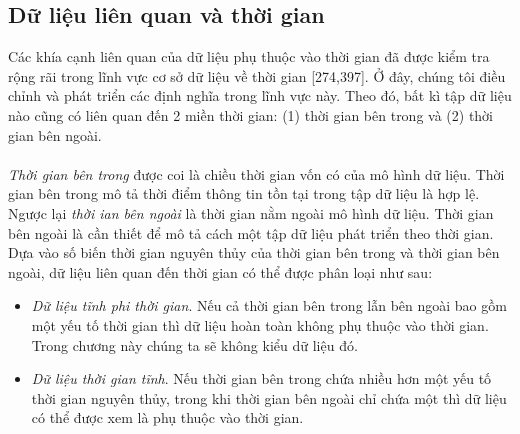 \subsection{Dữ liệu liên quan và thời gian}
Các khía cạnh liên quan của dữ liệu phụ thuộc vào thời gian đã được kiểm tra rộng rãi trong lĩnh vực cơ sở dữ liệu về thời gian [274,397]. Ở đây, chúng tôi điều chỉnh và phát triển các định nghĩa trong lĩnh vực này. Theo đó, bất kì tập dữ liệu nào cũng có liên quan đến 2 miền thời gian: (1) thời gian bên trong và (2) thời gian bên ngoài. 
\\ \\
\textit{Thời gian bên trong} được coi là chiều thời gian vốn có của mô hình dữ liệu. Thời gian bên trong mô tả thời điểm thông tin tồn tại trong tập dữ liệu là hợp lệ. Ngược lại \textit{thời ian bên ngoài} là thời gian nằm ngoài mô hình dữ liệu. Thời gian bên ngoài là cần thiết để mô tả cách một tập dữ liệu phát triển theo thời gian. Dựa vào số biến thời gian nguyên thủy của thời gian bên trong và thời gian bên ngoài, dữ liệu liên quan đến thời gian có thể được phân loại như sau:
\begin{itemize}
    \item \textit{Dữ liệu tĩnh phi thời gian}. Nếu cả thời gian bên trong lẫn bên ngoài bao gồm một yếu tố thời gian thì dữ liệu hoàn toàn không phụ thuộc vào thời gian. Trong chương này chúng ta sẽ không kiểu dữ liệu đó.
    \item \textit{Dữ liệu thời gian tĩnh}. Nếu thời gian bên trong chứa nhiều hơn một yếu tố thời gian nguyên thủy, trong khi thời gian bên ngoài chỉ chứa một thì dữ liệu có thể được xem là phụ thuộc vào thời gian.
\end{itemize}